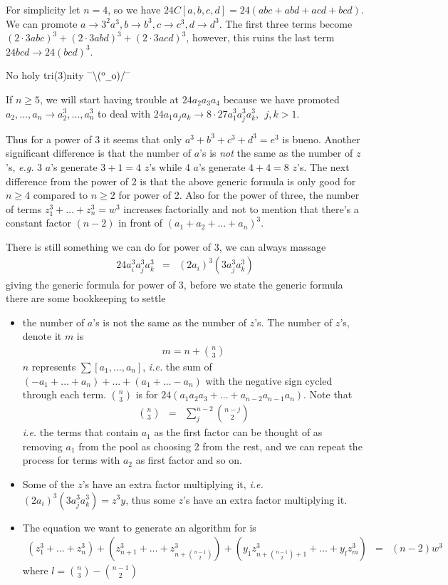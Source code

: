 \documentclass[aps,preprint,preprintnumbers,nofootinbib,showpacs,prd]{revtex4-1}
\newcommand{\ie}{{\it i.e.} }
\newcommand{\eg}{{\it e.g.} }
\newcommand{\bit}{\begin{itemize}}
\newcommand{\eit}{\end{itemize}}
\newcommand{\nbea}{\begin{eqnarray*}}
\newcommand{\neea}{\end{eqnarray*}}
\newcommand{\dunno}{$ {}^{\mbox {--}}\backslash(^{\rm o}{}\underline{\hspace{0.2cm}}{\rm o})/^{\mbox {--}}$}
\begin{document}
For simplicity let $n = 4$, so we have $24 C[a, b, c, d] = 24 (abc + abd + acd + bcd)$. We can promote $a \rightarrow 3^2 a^3, b \rightarrow b^3,  c \rightarrow c^3, d \rightarrow d^3$. The first three terms become $(2 \cdot 3 a b c)^3 + (2 \cdot 3 a b d)^3 + (2 \cdot 3 a c d)^3$, however, this ruins the last term $24 bcd \rightarrow 24 (bcd)^3$. 

No holy tri(3)nity \dunno

If $n \ge 5$, we will start having trouble at $24 a_2 a_3 a_4$ because we have promoted $a_2, \dots, a_n \rightarrow a_2^3, \dots, a_n^3$ to deal with $24 a_1 a_j a_k \rightarrow 8 \cdot 27 a_1^3 a_j^3 a_k^3,~~ j,k > 1$. 

Thus for a power of 3 it seems that only $a^3 + b^3 + c^3 + d^3 = e^3$ is bueno. Another significant difference is that the number of $a$'s is {\it not} the same as the number of $z$'s, \eg 3 $a$'s generate $3+1=4$ $z$'s while 4 $a$'s generate $4+4=8$ $z$'s. The next difference from the power of 2 is that the above generic formula is only good for $n \ge 4$ compared to $n \ge 2$ for power of 2. Also for the power of three, the number of terms $z_1^3 + \dots + z_n^3 = w^3$ increases factorially and not to mention that there's a constant factor $(n-2)$ in front of $(a_1+a_2+\dots+a_n)^3$.

There is still something we can do for power of 3, we can always massage
%
\nbea
24 a_i^3 a_j^3 a_k^3 & = & (2 a_i)^3 ( 3 a_j^3 a_k^3)
\neea
% 
giving the generic formula for power of 3, before we state the generic formula there are some bookkeeping to settle
%
\bit
\item the number of $a$'s is not the same as the number of $z$'s. The number of $z$'s, denote it $m$ is
%
\nbea
m = n + {n \choose 3}
\neea
%
$n$ represents $\sum [a_1, \dots, a_n]$, \ie the sum of $(-a_1 + \dots + a_n) + \dots + (a_1 + \dots - a_n)$ with the negative sign cycled through each term. ${n \choose 3}$ is for $24 (a_1a_2a_3 + \dots + a_{n-2}a_{n-1}a_{n})$. Note that
%
\nbea
{n \choose 3} & = & \sum_{j}^{n-2} {n-j \choose 2} 
\neea
%
\ie the terms that contain $a_1$ as the first factor can be thought of as removing $a_1$ from the pool as choosing 2 from the rest, and we can repeat the process for terms with $a_2$ as first factor and so on.
\item Some of the $z$'s have an extra factor multiplying it, \ie $(2 a_i)^3 ( 3 a_j^3 a_k^3) = z^3 y$, thus some $z$'s have an extra factor multiplying it.
\item The equation we want to generate an algorithm for is 
%
\nbea
\left ( z_1^3 + \dots + z_n^3 \right ) + \left ( z_{n+1}^3 + \dots + z_{n + {n-1 \choose 2}}^3 \right ) + \left ( y_1 z_{n + {n-1 \choose 2} + 1}^3 + \dots + y_l z_{m}^3 \right ) & = & (n-2)w^3
\neea
%
where $l = {n \choose 3} - {n-1 \choose 2}$
\eit
%
\end{document}
